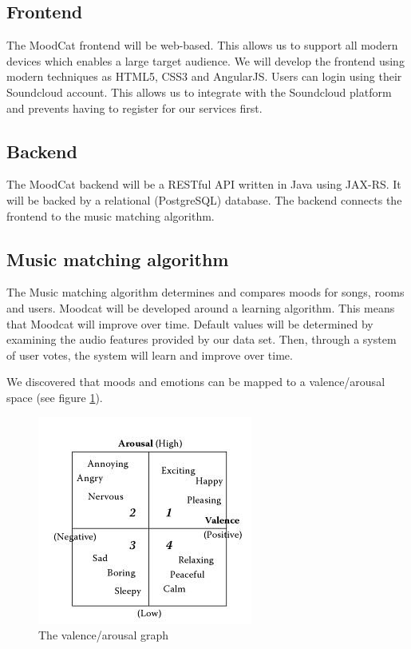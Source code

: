 \documentclass[10pt,a4paper]{article}
\begin{document}
\newpage

\subsection{Frontend}

The MoodCat frontend will be web-based.
This allows us to support all modern devices which enables a large target audience.
We will develop the frontend using modern techniques as HTML5\cite{HTML}, CSS3\cite{CSS} and AngularJS\cite{AngularJS}.
Users can login using their Soundcloud account.
This allows us to integrate with the Soundcloud platform and prevents having to register for our services first.

\subsection{Backend}

The MoodCat backend will be a RESTful\cite{rest} API written in Java using JAX-RS. It will be backed by a relational (PostgreSQL) database. The backend connects the frontend to the music matching algorithm.

\subsection{Music matching algorithm}

The Music matching algorithm determines and compares moods for songs, rooms and users.
Moodcat will be developed around a learning algorithm.
This means that Moodcat will improve over time.
Default values will be determined by examining the audio features provided by our data set.
Then, through a system of user votes, the system will learn and improve over time.

We discovered that moods and emotions can be mapped to a valence/arousal space (see figure \ref{fig:avgraph}).

\begin{figure}[h]
\center
\includegraphics[scale=0.75]{avgraph.jpg}
\caption{The valence/arousal graph \cite{Book}}
\endcenter
\label{fig:avgraph}

\end{figure}
\end{document}
